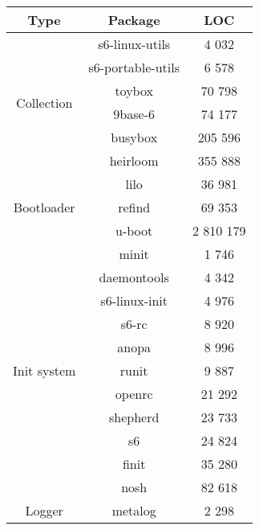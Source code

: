 \begin{table}[!ht]
    \centering
    \begin{tabular}{|c|c|c|}
        \hline
        Type & Package & LOC \\
        \hline
        \hline
        \multirow{6}{*}{Collection}
        & s6-linux-utils \cite{s6-linux} & 4 032 \\
        \cline{2-3}
        & s6-portable-utils \cite{s6-portable} & 6 578 \\
        \cline{2-3}
        & toybox \cite{toybox} & 70 798 \\
        \cline{2-3}
        & 9base-6 \cite{9base} & 74 177 \\
        \cline{2-3}
        & busybox \cite{busybox} & 205 596 \\
        \cline{2-3}
        & heirloom \cite{heirloom} \footnotemark & 355 888 \\
        \hline
        \hline
        \multirow{3}{*}{Bootloader}
        & lilo \cite{lilo} & 36 981 \\
        \cline{2-3}
        & refind \cite{refind} & 69 353 \\
        \cline{2-3}
        & u-boot \cite{uboot} & 2 810 179 \\
        \hline
        \hline
        \multirow{11}{*}{Init system}
        & minit \cite{minit} & 1 746 \\
        \cline{2-3}
        & daemontools \cite{daemontools} & 4 342 \\
        \cline{2-3}
        & s6-linux-init \cite{s6-linux-init} & 4 976 \\
        \cline{2-3}
        & s6-rc \cite{s6-rc} & 8 920 \\
        \cline{2-3}
        & anopa \cite{anopa} & 8 996 \\
        \cline{2-3}
        & runit \cite{runit} & 9 887 \\
        \cline{2-3}
        & openrc \cite{openrc} & 21 292 \\
        \cline{2-3}
        & shepherd \cite{shepherd} & 23 733 \\
        \cline{2-3}
        & s6 \cite{s6} & 24 824 \\
        \cline{2-3}
        & finit \cite{finit} & 35 280 \\
        \cline{2-3}
        & nosh \cite{nosh} & 82 618 \\
        \hline
        \hline
        \multirow{3}{*}{Logger}
        & metalog \cite{metalog} & 2 298 \\

\end{tabular}
\end{table}
